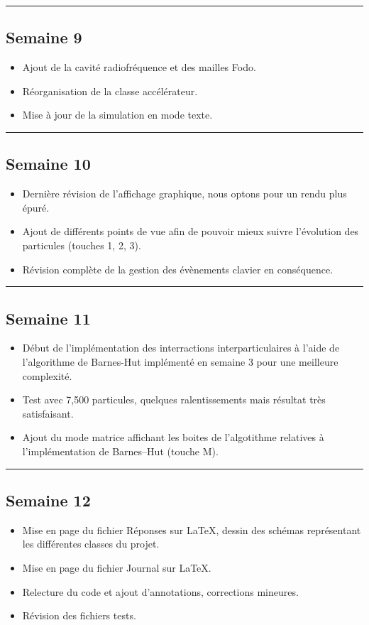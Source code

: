 \documentclass[12pt, letterpaper, twoside]{article}
\begin{document}
\rule{\textwidth}{0.4pt}

\subsection*{Semaine 9}
\begin{itemize}
\item Ajout de la cavité radiofréquence et des mailles Fodo.
\item Réorganisation de la classe accélérateur.
\item Mise à jour de la simulation en mode texte.
\end{itemize}

\rule{\textwidth}{0.4pt}

\subsection*{Semaine 10}
\begin{itemize}
\item Dernière révision de l’affichage graphique, nous optons pour un rendu plus épuré.
\item Ajout de différents points de vue afin de pouvoir mieux suivre l’évolution des particules (touches 1, 2, 3).
\item Révision complète de la gestion des évènements clavier en conséquence.
\end{itemize}

\rule{\textwidth}{0.4pt}

\subsection*{Semaine 11}
\begin{itemize}
\item Début de l’implémentation des interractions interparticulaires à l’aide de l’algorithme de Barnes-Hut implémenté en semaine 3 pour une meilleure complexité.
\item Test avec 7,500 particules, quelques ralentissements mais résultat très satisfaisant.
\item Ajout du mode matrice affichant les boites de l’algotithme relatives à l'implémentation de Barnes--Hut (touche M).
\end{itemize}

\rule{\textwidth}{0.4pt}

\subsection*{Semaine 12}
\begin{itemize}
\item Mise en page du fichier Réponses sur \LaTeX, dessin des schémas représentant les différentes classes du projet.
\item Mise en page du fichier Journal sur \LaTeX.
\item Relecture du code et ajout d’annotations, corrections mineures.
\item Révision des fichiers tests.
\end{itemize}
\end{document}
